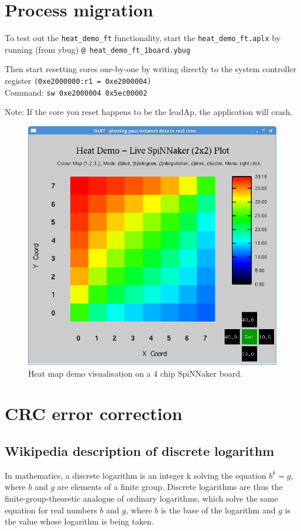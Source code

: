 \documentclass[a4paper, 11pt]{article}
\begin{document}


\newpage
\section{Process migration}

To test out the \verb|heat_demo_ft| functionality, start the \verb|heat_demo_ft.aplx|
by running (from ybug) \verb|@ heat_demo_ft_1board.ybug|

Then start resetting cores one-by-one by writing directly to the system
controller register \verb|(0xe2000000:r1 = 0xe2000004)|\\
Command: \verb|sw 0xe2000004 0x5ec00002|

Note: If the core you reset happens to be the leadAp, the application will
crash.

\begin{figure}[htbp]
	\centering
	\includegraphics[width=0.6\linewidth]{images/heatmap2x2.png}
	\caption{Heat map demo visualisation on a 4 chip SpiNNaker board.}	
\end{figure}


\newpage
\section{CRC error correction}

\subsection{Wikipedia description of discrete logarithm}
In mathematics, a discrete logarithm is an integer k solving the equation $b^k = g$, where $b$ and $g$ are elements of a finite group. Discrete logarithms are thus the finite-group-theoretic analogue of ordinary logarithms, which solve the same equation for real numbers $b$ and $g$, where $b$ is the base of the logarithm and $g$ is the value whose logarithm is being taken.
\end{document}
